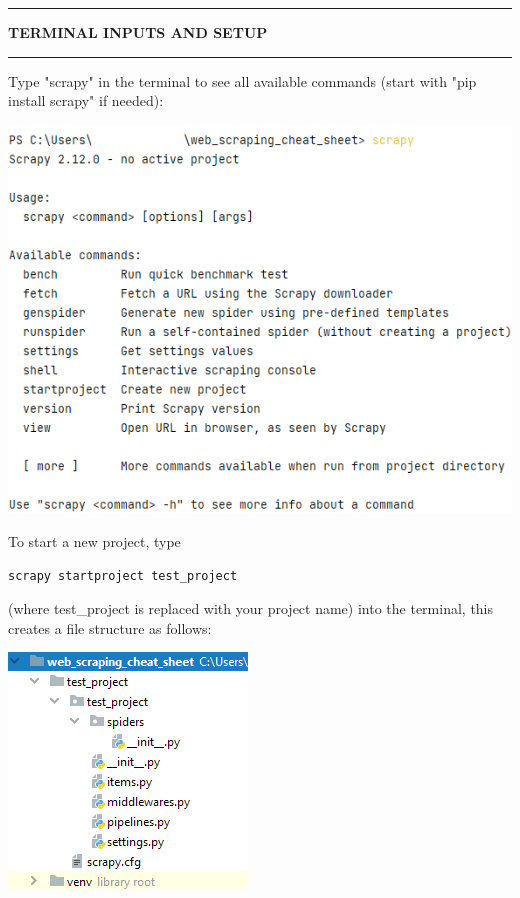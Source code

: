 \documentclass[8pt]{extarticle}
\newcommand{\heading}[1]{%
    \noindent
    \rule{\linewidth}{0.4pt}
    \begin{center}
        \vspace{-1ex}
        \textbf{#1}        
        \vspace{-2.5ex}
    \end{center}
    \rule{\linewidth}{0.4pt}
}
\begin{document}
\begin{multicols}{3}
\setlength{\columnseprule}{1pt} %

\heading{TERMINAL INPUTS AND SETUP}

Type "scrapy" in the terminal to see all available commands (start with "pip install scrapy" if needed):

\begin{center}
    \includegraphics[width=0.9\columnwidth]{images/scrapy_commands.png}
\end{center}

To start a new project, type 

\begin{lstlisting}[style=python]     
    scrapy startproject test_project
\end{lstlisting}

(where test\_project is replaced with your project name) into the terminal, this creates a file structure as follows:

\begin{center}
    \includegraphics[width=0.4\columnwidth]{images/scrapy_project_hierarchy.png}
\end{center}


\end{multicols}
\end{document}
